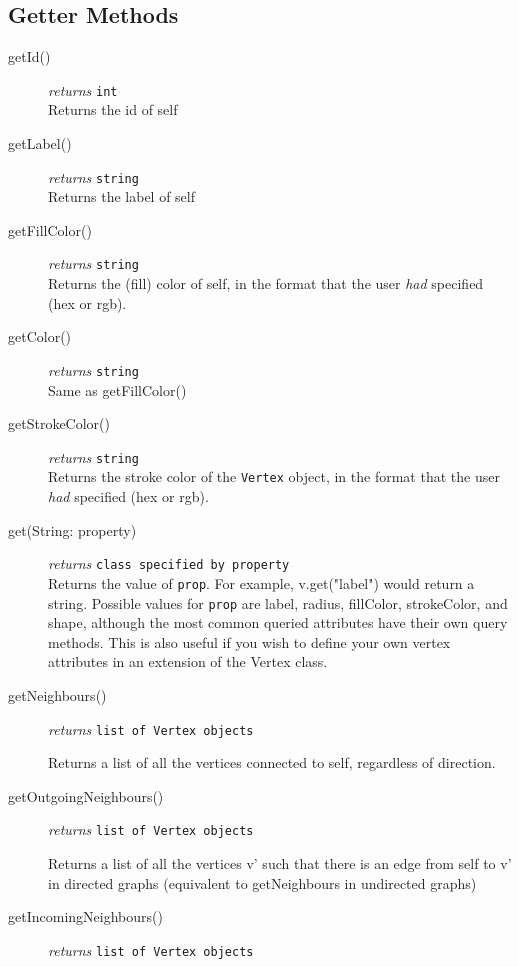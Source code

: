 \documentclass{article}
\newcounter{example}
\newlength\q
\begin{document}
\subsection{Getter Methods}
\begin{description}
\item[getId()] \emph{returns} \texttt{int}\\
Returns the id of self

\item[getLabel()] \emph{returns} \texttt{string}\\
Returns the label of self

\item[getFillColor()] \emph{returns} \texttt{string}\\
Returns the (fill) color of self, in the format that the user \textit{had} specified (hex or rgb).

\item[getColor()] \emph{returns} \texttt{string}\\
Same as getFillColor()

\item[getStrokeColor()] \emph{returns} \texttt{string}\\
Returns the stroke color of the \texttt{Vertex} object, in the format that the user \textit{had} specified (hex or rgb).

\item[get(String: property)] \emph{returns} \texttt{class specified by property}\\
Returns the value of \texttt{prop}. For example, v.get("label") would return a string. Possible values for \texttt{prop} are label, radius, fillColor, strokeColor, and shape, although the most common queried attributes have their own query methods. This is also useful if you wish to define your own vertex attributes in an extension of the Vertex class.

\item[getNeighbours()]\emph{returns}
  \texttt{list of Vertex objects}

Returns a list of all the vertices connected to self, regardless of direction.

\item[getOutgoingNeighbours()]\emph{returns}
  \texttt{list of Vertex objects}

Returns a list of all the vertices v' such that there is an edge from self to v' in directed graphs (equivalent to getNeighbours in undirected graphs)

\item[getIncomingNeighbours()]\emph{returns}
  \texttt{list of Vertex objects}


\end{description}
\end{document}
